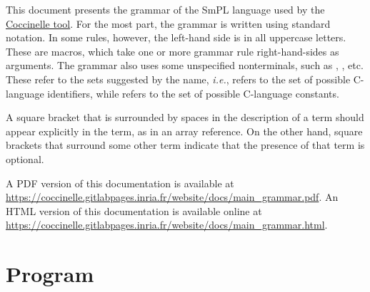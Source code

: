 

This document presents the grammar of the SmPL language used by the
\href{https://coccinelle.gitlabpages.inria.fr/website/}{Coccinelle tool}.  For the most
part, the grammar is written using standard notation.  In some rules,
however, the left-hand side is in all uppercase letters.  These are
macros, which take one or more grammar rule right-hand-sides as
arguments.  The grammar also uses some unspecified nonterminals, such
as , , etc.  These refer to the sets suggested by
the name, {\em i.e.},  refers to the set of possible
C-language identifiers, while  refers to the set of
possible C-language constants.

A square bracket that is surrounded by spaces in the description of a term
should appear explicitly in the term, as in an array reference.  On the
other hand, square brackets that surround some other term indicate that the
presence of that term is optional.

%
\ifhevea
A PDF version of this documentation is available at
\url{https://coccinelle.gitlabpages.inria.fr/website/docs/main_grammar.pdf}.
\else
An HTML version of this documentation is available online at
\url{https://coccinelle.gitlabpages.inria.fr/website/docs/main_grammar.html}.
\fi

\section{Program}

\begin{grammar}


\end{grammar}


